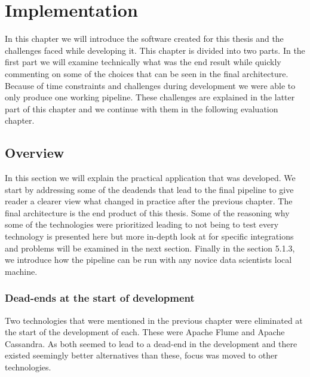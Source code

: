 \chapter{Implementation}
\label{chapter:implementation}



In this chapter we will introduce the software created for this thesis and the challenges faced while developing it.
This chapter is divided into two parts.
In the first part we will examine technically what was the end result while quickly commenting on some of the choices that can be seen in the final architecture.
Because of time constraints and challenges during development we were able to only produce one working pipeline.
These challenges are explained in the latter part of this chapter and we continue with them in the following evaluation chapter.

\section{Overview}

In this section we will explain the practical application that was developed.
We start by addressing some of the deadends that lead to the final pipeline to give reader a clearer view what changed in practice after the previous chapter.
The final architecture is the end product of this thesis.
Some of the reasoning why some of the technologies were prioritized leading to not being to test every technology is presented here but more in-depth look at for specific integrations and problems will be examined in the next section.
Finally in the section 5.1.3, we introduce how the pipeline can be run with any novice data scientists local machine.


\subsection{Dead-ends at the start of development}

Two technologies that were mentioned in the previous chapter were eliminated at the start of the development of each.
These were Apache Flume and Apache Cassandra.
As both seemed to lead to a dead-end in the development and there existed seemingly better alternatives than these, focus was moved to other technologies.

